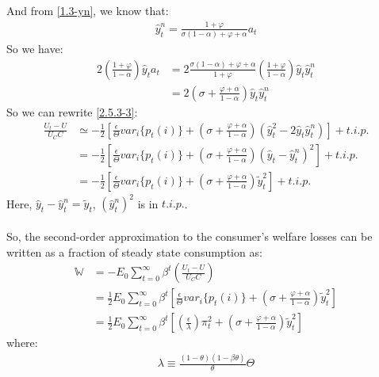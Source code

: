 \documentclass{article}
\numberwithin{equation}{section}
\begin{document}
And from \eqref{1.3-yn}, we know that:
	\begin{align*}
		\hat{y}^n_t = \frac{1 + \varphi}{\sigma(1 - \alpha) + \varphi + \alpha}a_t
	\end{align*}
So we have:
	\begin{align*}
		2 \left( \frac{1 + \varphi}{1 - \alpha} \right) \hat{y}_ta_t &= 2 \frac{\sigma(1 - \alpha) + \varphi + \alpha}{1 + \varphi} \left( \frac{1 + \varphi}{1 - \alpha} \right) \hat{y}_t\hat{y}^n_t\\
		&= 2 \left(\sigma + \frac{\varphi + \alpha}{1 - \alpha} \right) \hat{y}_t\hat{y}^n_t
	\end{align*}
So we can rewrite \eqref{2.5.3-3}:
	\begin{align}
		\frac{U_t - U}{U_C C} &\simeq -\frac{1}{2} \left[ \frac{\epsilon}{\Theta} var_i\{ p_t(i) \} + \left( \sigma + \frac{\varphi + \alpha}{1 - \alpha} \right) (\hat{y}^2_t - 2\hat{y}_t\hat{y}^n_t) \right] + t.i.p. \nonumber\\
		&= -\frac{1}{2} \left[ \frac{\epsilon}{\Theta} var_i\{ p_t(i) \} + \left( \sigma + \frac{\varphi + \alpha}{1 - \alpha} \right) (\hat{y}_t - \hat{y}^n_t)^2 \right] + t.i.p. \nonumber\\
		&= -\frac{1}{2} \left[ \frac{\epsilon}{\Theta} var_i\{ p_t(i) \} + \left( \sigma + \frac{\varphi + \alpha}{1 - \alpha} \right) \tilde{y}^2_t \right] + t.i.p. \label{2.5.3-4}
	\end{align}
Here, $\hat{y}_t - \hat{y}^n_t = \tilde{y}_t$, $\left( \hat{y}^n_t \right)^2$ is in $t.i.p.$.\\\\
So, the second-order approximation to the consumer's welfare losses can be written as a fraction of steady state consumption as:
	\begin{align}
		\mathbb{W} &= -E_0 \sum\limits^\infty_{t=0} \beta^t \left( \frac{U_t - U}{U_CC} \right) \nonumber\\
		&= \frac{1}{2} E_0 \sum\limits^\infty_{t=0} \beta^t \left[ \frac{\epsilon}{\Theta} var_i\{ p_t(i) \} + \left( \sigma + \frac{\varphi + \alpha}{1 - \alpha} \right) \tilde{y}^2_t \right] \nonumber\\
		&= \frac{1}{2} E_0 \sum\limits^\infty_{t=0} \beta^t \left[ \left( \frac{\epsilon}{\lambda} \right) \pi^2_t + \left( \sigma + \frac{\varphi + \alpha}{1 - \alpha} \right) \tilde{y}^2_t \right] \label{2.5.3-5}
	\end{align}
where:
	\begin{align*}
		\lambda \equiv \frac{(1 - \theta)(1 - \beta\theta)}{\theta} \Theta
	\end{align*}
\end{document}
